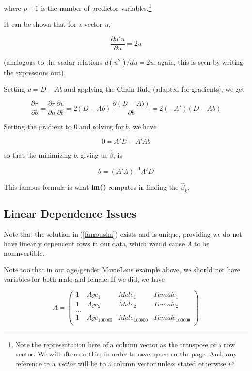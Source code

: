 where $p+1$ is the number of predictor variables.\footnote{Note the
representation here of a column vector as the transpose of a row vector.
We will often do this, in order to save space on the page.  And, any
reference to a \textit{vector} will be to a column vector unless stated
otherwise.}

It can be shown that for a vector $u$, 

\begin{equation}
\frac{\partial u'u}{\partial u} = 2u
\end{equation}

(analogous to the scalar relations $d (u^2) /du = 2u$; again, this is
seen by writing the expressions out).

Setting $u = D - Ab$ and applying the Chain Rule (adapted for
gradients), we get

\begin{equation}
\frac{\partial r}{\partial b} = 
\frac{\partial r}{\partial u} 
\frac{\partial u}{\partial b} =
2(D - Ab) ~ \frac{\partial (D - Ab)}{\partial b}=
2 (-A') (D - Ab) 
\end{equation}

Setting the gradient to 0 and solving for $b$, we have

\begin{equation}
\label{adaab}
0 = A'D - A'Ab
\end{equation}  

so that the minimizing $b$, giving us $\widehat{\beta}$, is

\begin{equation}
\label{famouslm}
b = (A'A)^{-1} A'D
\end{equation}

This famous formula is what \textbf{lm()} computes in finding the
$\widehat{\beta}_k$.

\subsection{Linear Dependence Issues}
\label{lindep}

Note that the solution in (\ref{famouslm}) exists and is unique,
providing we do not have linearly dependent rows in our data, which
would cause $A$ to be noninvertible.

Note too that in our age/gender MovieLens example above, we should not
have variables for both male and female.  If we did, we have

\begin{equation}
A =
\left(
\begin{array}{rrrr}
1 & Age_1 & Male_1 & Female_1 \\
1 & Age_2 & Male_2 & Female_2 \\
... \\
1 & Age_{100000} & Male_{100000} & Female_{100000} \\
\end{array}
\right )
\end{equation}

